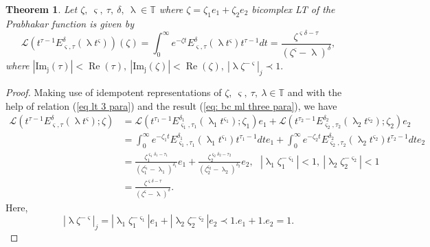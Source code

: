 \documentclass[a4paper,12pt]{article}
\newtheorem{theorem}{Theorem}[section]
\theoremstyle{remark}
\begin{document}
\begin{theorem}\label{th:lt two para}
Let $\zeta,~ \varsigma,~\tau,~\delta,~\uplambda \in \mathds{T} $ where $\zeta=\zeta_1e_1+\zeta_2e_2$ bicomplex
LT of the Prabhakar function	is given by 
\begin{equation}\label{eq:bclt 3para}
\mathcal{L}(t^{\tau-1}E_{ \varsigma,\tau}^\delta(\uplambda t^{ \varsigma}))(\zeta)=\int_{0}^{\infty}e^{-\zeta t}E_{ \varsigma, \tau}^\delta(\uplambda t^{ \varsigma})t^{\tau-1}dt=\frac{\zeta^{ \varsigma\delta-\tau}}{(\zeta^{ \varsigma}-\uplambda)^\delta},
\end{equation}
where	
$|\operatorname{Im_j}(\tau)|<\operatorname{Re}(\tau),~|\operatorname{Im_j}(\zeta)|<\operatorname{Re}(\zeta),~|\uplambda \zeta^{- \varsigma}|_j\prec1.$\\
	
\end{theorem}
\begin{proof}
Making use of idempotent representations of $\zeta,~ \varsigma,~\tau,~\lambda \in \mathds{T} $ %
and with the help of relation 
 (\ref{eq lt 3 para}) and the result (\ref{eq: bc ml three para}), we have
	\begin{equation}\label{eq:bc lap 2mla}
	\begin{split}
	\mathcal{L}(t^{\tau-1}E_{ \varsigma,\tau}^\delta(\uplambda t^{ \varsigma});\zeta)&=\mathcal{L}(t^{\tau_1-1}E_{ \varsigma_1,\tau_1}^{\delta_1}(\uplambda_1 t^{ \varsigma_1});\zeta_1)e_1+\mathcal{L}(t^{\tau_2-1}E_{ \varsigma_2,\tau_2}^{\delta_2}(\uplambda_2 t^{ \varsigma_2});\zeta_2)e_2\\
	&=\int_{0}^{\infty}e^{-\zeta_1 t}E_{ \varsigma_1, \tau_1}^{\delta_1}(\uplambda_1 t^{ \varsigma_1})t^{\tau_1-1}dte_1+\int_{0}^{\infty}e^{-\zeta_2 t}E_{ \varsigma_2, \tau_2}^{\delta_2}(\uplambda_2 t^{ \varsigma_2})t^{\tau_2-1}dte_2\\
	&=\frac{\zeta_1^{ \varsigma_1\delta_1-\tau_1}}{(\zeta_1^{ \varsigma_1}-\uplambda_1)^{\delta_1}}e_1+\frac{\zeta_2^{ \varsigma_2\delta_2-\tau_2}}{(\zeta_2^{ \varsigma_2}-\uplambda_2)^{\delta_2}}e_2,~~~|\uplambda_1 \zeta_1^{- \varsigma_1}|<1,~|\uplambda_2 \zeta_2^{- \varsigma_2}|<1\\
	&=\frac{\zeta^{ \varsigma\delta-\tau}}{(\zeta^{ \varsigma}-\uplambda)^\delta}.
	\end{split}
	\end{equation}
	Here,
	\begin{equation}
	|\uplambda \zeta^{- \varsigma}|_j=|\uplambda_1 \zeta_1^{- \varsigma_1}|e_1+|\uplambda_2 \zeta_2^{- \varsigma_2}|e_2
	\prec1.e_1+1.e_2
	=1.
	\end{equation}	
	
\end{proof}
\end{document}
